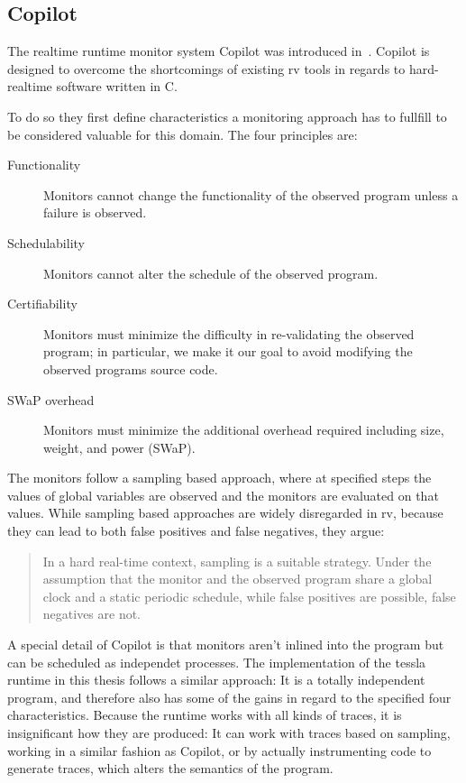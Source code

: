 \subsection{Copilot}
\label{sec:related:c_programs:copilot}

The realtime runtime monitor system Copilot was introduced in~\cite{Pike2010}.
Copilot is designed to overcome the shortcomings of existing \gls{rv} tools in regards to hard-realtime software written in C.

To do so they first define characteristics a monitoring approach has to fullfill to be considered valuable for this domain.
The four principles are:

\begin{description}
  \item[Functionality] Monitors cannot change the functionality of the observed program unless a failure is observed.
  \item[Schedulability] Monitors cannot alter the schedule of the observed program.
  \item[Certifiability] Monitors must minimize the difficulty in re-validating the observed program; in particular, we make it our goal to avoid modifying the observed programs source code.
  \item[SWaP overhead] Monitors must minimize the additional overhead required including size, weight, and power (SWaP).
\end{description}

The monitors follow a sampling based approach, where at specified steps the values of global variables are observed and the monitors are evaluated
on that values.
While sampling based approaches are widely disregarded in \gls{rv}, because they can lead to both false positives and false negatives,
they argue:

\begin{quote}
  In a hard real-time context, sampling is a suitable strategy.
  Under the assumption that the monitor and the observed program share a global clock and a static periodic schedule, while false positives are possible, false negatives are not.~\cite{Pike2010}
\end{quote}

A special detail of Copilot is that monitors aren't inlined into the program but can be scheduled as independet processes.
The implementation of the \gls{tessla} runtime in this thesis follows a similar approach: It is a totally independent program,
and therefore also has some of the gains in regard to the specified four characteristics.
Because the runtime works with all kinds of traces, it is insignificant how they are produced:
It can work with traces based on sampling, working in a similar fashion as Copilot, or by actually instrumenting code to generate
traces, which alters the semantics of the program.

